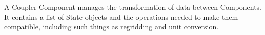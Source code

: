 %


A Coupler Component manages the transformation of data between Components.
It contains a list of State objects and the operations needed to
make them compatible, including such things as regridding and unit conversion.


